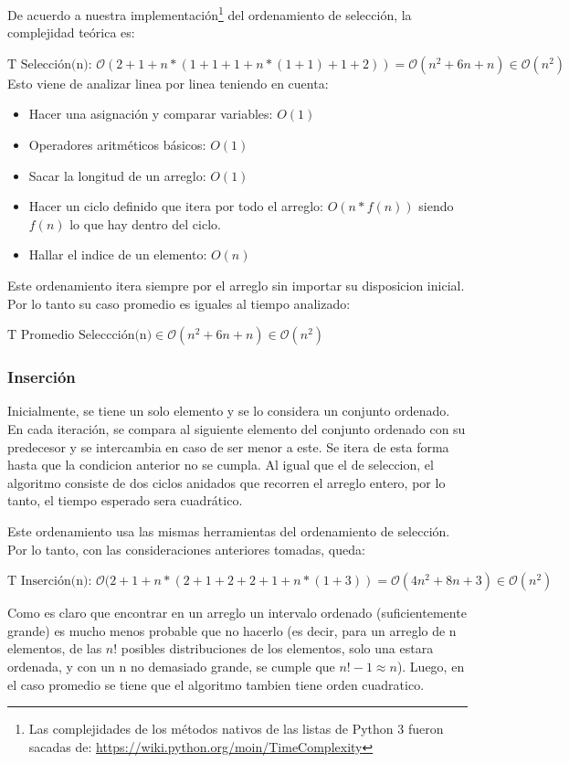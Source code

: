 \documentclass[article,a4paper]{article}
\begin{document}
De acuerdo a nuestra implementación\footnote{Las complejidades de los métodos nativos de las listas de Python 3 fueron sacadas de: \url{https://wiki.python.org/moin/TimeComplexity}} del ordenamiento de selección, la complejidad teórica es:

$\mbox{T Selección(n): } \mathcal O(2 + 1 + n * (1 + 1 + 1 + n * (1 + 1) + 1 + 2)) = \mathcal O(n^2 + 6n + n) \in \mathcal O(n^2)$\\

Esto viene de analizar linea por linea teniendo en cuenta:
\begin{itemize}
\item Hacer una asignación y comparar variables: $O(1)$
\item Operadores aritméticos básicos: $O(1)$
\item Sacar la longitud de un arreglo: $O(1)$
\item Hacer un ciclo definido que itera por todo el arreglo: $O(n * f(n))$ siendo $f(n)$ lo que hay dentro del ciclo.
\item Hallar el indice de un elemento: $O(n)$
\end{itemize}

Este ordenamiento itera siempre por el arreglo sin importar su disposicion inicial. Por lo tanto su caso promedio es iguales al tiempo analizado:

$\mbox{T Promedio Seleccción(n)} \in \mathcal O(n^2 + 6n + n) \in \mathcal O(n^2)$


\subsubsection{Inserción}

Inicialmente, se tiene un solo elemento y se lo considera un conjunto ordenado. En cada iteración, se compara al siguiente elemento del conjunto ordenado con su predecesor y se intercambia en caso de ser menor a este. Se itera de esta forma hasta que la condicion anterior no se cumpla. Al igual que el de seleccion, el algoritmo consiste de dos ciclos anidados que recorren el arreglo entero, por lo tanto, el tiempo esperado sera cuadrático.

Este ordenamiento usa las mismas herramientas del ordenamiento de selección. Por lo tanto, con las consideraciones anteriores tomadas, queda:

$\mbox{T Inserción(n): } \mathcal O( 2 + 1 + n * (2 + 1 + 2 + 2 + 1 + n * (1 + 3)) = \mathcal O(4n^2 + 8n + 3) \in \mathcal O(n^2)$

Como es claro que encontrar en un arreglo un intervalo ordenado (suficientemente grande) es mucho menos probable que no hacerlo (es decir, para un arreglo de n elementos, de las $n!$ posibles distribuciones de los elementos, solo una estara ordenada, y con un n no demasiado grande, se cumple que $n!-1 \approx n$). Luego, en el caso promedio se tiene que el algoritmo tambien tiene orden cuadratico.
\end{document}

